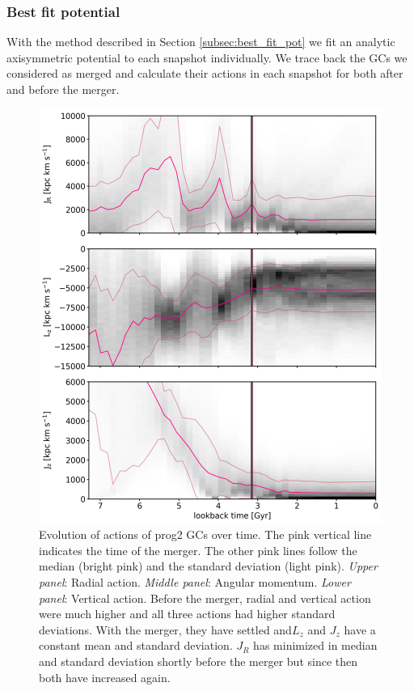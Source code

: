 \subsubsection{Best fit potential}\label{subsubsec:GCs_action_time_right_pot}
With the method described in Section \ref{subsec:best_fit_pot} we fit an analytic axisymmetric potential to each snapshot individually. We trace back the \acp{GC} we considered as merged and calculate their actions in each snapshot for both after and before the merger. 
\begin{figure}[htbp]
\captionsetup{format=plain}
    \centering
	\includegraphics[width=\textwidth]{plots/Dynamics/prog2/action_time_evolution_wodisk_hist_mean.png}

	\caption{Evolution of actions of prog2 \acp{GC} over time. The pink vertical line indicates the time of the merger. The other pink lines follow the median (bright pink) and the standard deviation (light pink). \textit{Upper panel}: Radial action. \textit{Middle panel}: Angular momentum. \textit{Lower panel}: Vertical action. Before the merger, radial and vertical action were much higher and all three actions had higher standard deviations. With the merger, they have settled and$L_z$ and $J_z$ have a constant mean and standard deviation. $J_R$ has minimized in median and standard deviation shortly before the merger but since then both have increased again.}\label{fig:actions_time_evolution_prog2}
\end{figure}

